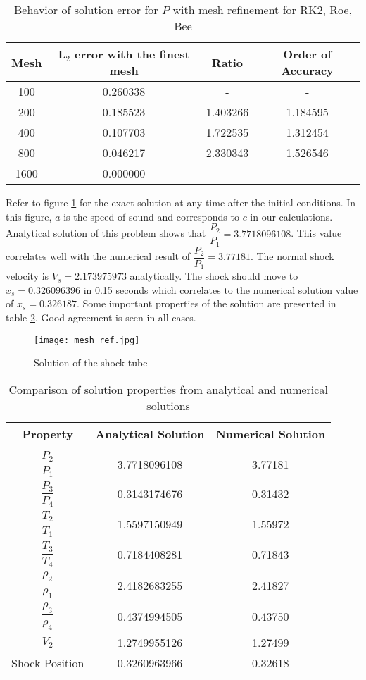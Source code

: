 \documentclass{article}
\begin{document}
\begin{table}[H]
\centering
\caption{Behavior of solution error for $P$ with mesh refinement for RK2, Roe, Bee}
\label{table_order_3}
\begin{tabular}{cccc}
\hline
Mesh & L$_2$ error with the finest mesh & Ratio & Order of Accuracy\\
\hline\hline
100&  0.260338 & - & - \\
200&  0.185523 & 1.403266 & 1.184595 \\
400&  0.107703 & 1.722535 & 1.312454 \\
800&  0.046217 & 2.330343 & 1.526546 \\
1600& 0.000000 & - & -\\
\hline
\end{tabular}
\end{table}

Refer to figure \ref{fig_ref_1} for the exact solution at any time after the initial conditions. In this figure, $a$ is the speed of sound and corresponds to $c$ in our calculations. Analytical solution of this problem shows that $\dfrac{P_2}{P_1}=3.7718096108$. This value correlates well with the numerical result of $\dfrac{P_2}{P_1}=3.77181$. The normal shock velocity is $V_s=2.173975973$ analytically. The shock should move to $x_s=0.326096396$ in 0.15 seconds which correlates to the numerical solution value of $x_s=0.326187$. Some important properties of the solution are presented in table \ref{table_depo_1}. Good agreement is seen in all cases.
\begin{figure}[H]
\centering
\texttt{[image: mesh\_ref.jpg]}
\caption{Solution of the shock tube \cite{hoffmann1993computational}}
\label{fig_ref_1}
\end{figure}
\begin{table}[H]
\centering
\caption{Comparison of solution properties from analytical and numerical solutions}
\label{table_depo_1}
\begin{tabular}{ccc}
\hline
Property & Analytical Solution & Numerical Solution \\
\hline\hline \\
$\dfrac{P_2}{P_1}$       & 3.7718096108  &  3.77181 \\[10pt]
$\dfrac{P_3}{P_4}$       & 0.3143174676  &  0.31432 \\[10pt]
$\dfrac{T_2}{T_1}$       & 1.5597150949  &  1.55972 \\[10pt]
$\dfrac{T_3}{T_4}$       & 0.7184408281  &  0.71843 \\[10pt]
$\dfrac{\rho_2}{\rho_1}$ & 2.4182683255  &  2.41827 \\[10pt]
$\dfrac{\rho_3}{\rho_4}$ & 0.4374994505  &  0.43750 \\[10pt]
$V_2$                    & 1.2749955126  &  1.27499 \\[10pt]
Shock Position           & 0.3260963966  &  0.32618 \\[10pt]
\hline
\end{tabular}
\end{table}
\end{document}
